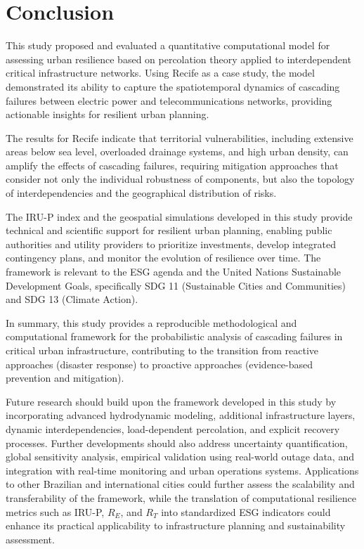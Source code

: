 \documentclass[journal]{IEEEtran}
\begin{document}
\section{Conclusion}
This study proposed and evaluated a quantitative computational model for assessing urban resilience based on percolation theory applied to interdependent critical infrastructure networks. Using Recife as a case study, the model demonstrated its ability to capture the spatiotemporal dynamics of cascading failures between electric power and telecommunications networks, providing actionable insights for resilient urban planning.

The results for Recife indicate that territorial vulnerabilities, including extensive areas below sea level, overloaded drainage systems, and high urban density, can amplify the effects of cascading failures, requiring mitigation approaches that consider not only the individual robustness of components, but also the topology of interdependencies and the geographical distribution of risks.

The IRU-P index and the geospatial simulations developed in this study provide technical and scientific support for resilient urban planning, enabling public authorities and utility providers to prioritize investments, develop integrated contingency plans, and monitor the evolution of resilience over time. The framework is relevant to the ESG agenda and the United Nations Sustainable Development Goals, specifically SDG 11 (Sustainable Cities and Communities) and SDG 13 (Climate Action).

In summary, this study provides a reproducible methodological and computational framework for the probabilistic analysis of cascading failures in critical urban infrastructure, contributing to the transition from reactive approaches (disaster response) to proactive approaches (evidence-based prevention and mitigation).

Future research should build upon the framework developed in this study by incorporating advanced hydrodynamic modeling, additional infrastructure layers, dynamic interdependencies, load-dependent percolation, and explicit recovery processes. Further developments should also address uncertainty quantification, global sensitivity analysis, empirical validation using real-world outage data, and integration with real-time monitoring and urban operations systems. Applications to other Brazilian and international cities could further assess the scalability and transferability of the framework, while the translation of computational resilience metrics such as IRU-P, $R_E$, and $R_T$ into standardized ESG indicators could enhance its practical applicability to infrastructure planning and sustainability assessment.
\end{document}
